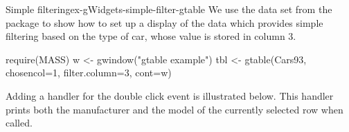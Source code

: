 \begin{example}{Simple filtering}{ex-gWidgets-simple-filter-gtable}
  We use the  data set from the  package to
  show how to set up a display of the data which provides simple
  filtering based on the type of car, whose value is stored in column 3.
  
\begin{Schunk}
\begin{Sinput}
 require(MASS)
 w <- gwindow("gtable example")
 tbl <- gtable(Cars93, chosencol=1, filter.column=3, cont=w)
\end{Sinput}
\end{Schunk}

Adding a handler for the double click event is illustrated below. This
handler prints both the manufacturer and the model of the currently
selected row when called.
\begin{Schunk}
\end{Schunk}
\end{example}


